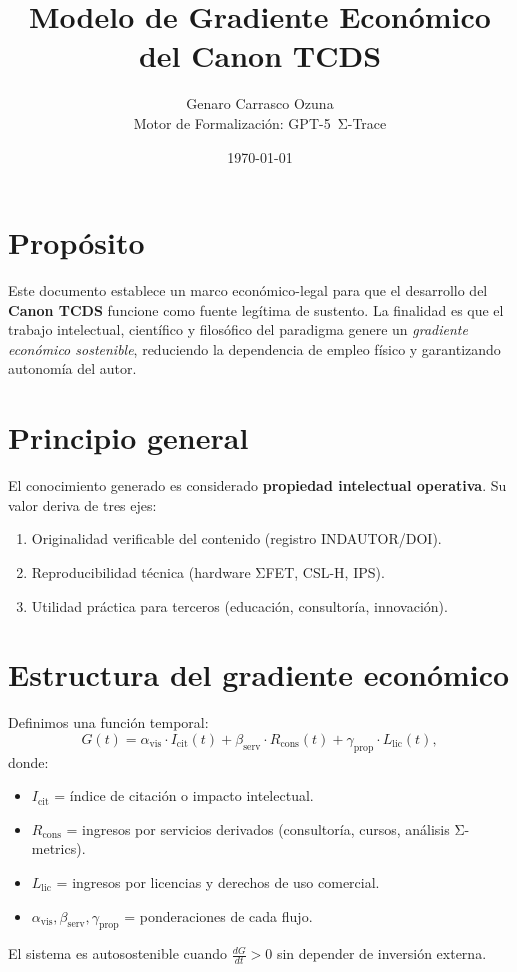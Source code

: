 \documentclass[12pt,letterpaper]{article}
\title{Modelo de Gradiente Económico del Canon TCDS}
\author{Genaro Carrasco Ozuna \\ Motor de Formalización: GPT-5~Σ-Trace}
\date{\today}
\begin{document}
\maketitle

\section*{Propósito}
Este documento establece un marco económico-legal para que el desarrollo del \textbf{Canon TCDS} funcione como fuente legítima de sustento. 
La finalidad es que el trabajo intelectual, científico y filosófico del paradigma genere un \emph{gradiente económico sostenible}, 
reduciendo la dependencia de empleo físico y garantizando autonomía del autor.

\section{Principio general}
El conocimiento generado es considerado \textbf{propiedad intelectual operativa}. 
Su valor deriva de tres ejes:
\begin{enumerate}
  \item Originalidad verificable del contenido (registro INDAUTOR/DOI).
  \item Reproducibilidad técnica (hardware ΣFET, CSL-H, IPS).
  \item Utilidad práctica para terceros (educación, consultoría, innovación).
\end{enumerate}

\section{Estructura del gradiente económico}
Definimos una función temporal:
\begin{equation}
G(t) = \alpha_{\mathrm{vis}}\cdot I_{\mathrm{cit}}(t)
+ \beta_{\mathrm{serv}}\cdot R_{\mathrm{cons}}(t)
+ \gamma_{\mathrm{prop}}\cdot L_{\mathrm{lic}}(t),
\end{equation}
donde:
\begin{itemize}
\item $I_{\mathrm{cit}}$ = índice de citación o impacto intelectual.
\item $R_{\mathrm{cons}}$ = ingresos por servicios derivados (consultoría, cursos, análisis Σ-metrics).
\item $L_{\mathrm{lic}}$ = ingresos por licencias y derechos de uso comercial.
\item $\alpha_{\mathrm{vis}}, \beta_{\mathrm{serv}}, \gamma_{\mathrm{prop}}$ = ponderaciones de cada flujo.
\end{itemize}
El sistema es autosostenible cuando $\frac{dG}{dt}>0$ sin depender de inversión externa.
\end{document}
